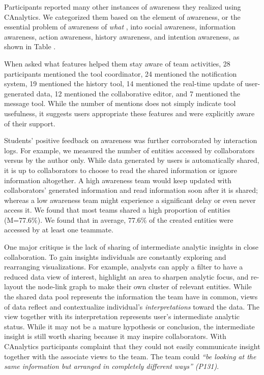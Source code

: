Participants reported many other instances of awareness they realized
using CAnalytics. We categorized them based on the element of awareness,
or the essential problem of awareness of \emph{what}
\autocite{Schmidt2002}, into social awareness, information awareness,
action awareness, history awareness, and intention awareness, as shown
in Table \autocite{tab:awareness}.

When asked what features helped them stay aware of team activities, 28
participants mentioned the tool coordinator, 24 mentioned the
notification system, 19 mentioned the history tool, 14 mentioned the
real-time update of user-generated data, 12 mentioned the collaborative
editor, and 7 mentioned the message tool. While the number of mentions
does not simply indicate tool usefulness, it suggests users appropriate
these features and were explicitly aware of their support.



Students' positive feedback on awareness was further corroborated by
interaction logs. For example, we measured the number of entities
accessed by collaborators versus by the author only. While data
generated by users is automatically shared, it is up to collaborators to
choose to read the shared information or ignore information altogether.
A high awareness team would keep updated with collaborators' generated
information and read information soon after it is shared; whereas a low
awareness team might experience a significant delay or even never access
it. We found that most teams shared a high proportion of entities
(M=77.6\%). We found that in average, 77.6\% of the created entities
were accessed by at least one teammate.

One major critique is the lack of sharing of intermediate analytic
insights in close collaboration. To gain insights individuals are
constantly exploring and rearranging visualizations. For example,
analysts can apply a filter to have a reduced data view of interest,
highlight an area to sharpen analytic focus, and re-layout the node-link
graph to make their own cluster of relevant entities. While the shared
data pool represents the information the team have in common, views of
data reflect and contextualize individual's \emph{interpretations}
toward the data. The view together with its interpretation represents
user's intermediate analytic status. While it may not be a mature
hypothesis or conclusion, the intermediate insight is still worth
sharing because it may inspire collaborators. With CAnalytics
participants complaint that they could not easily communicate insight
together with the associate views to the team. The team could \emph{``be
looking at the same information but arranged in completely different
ways'' (P131)}.

